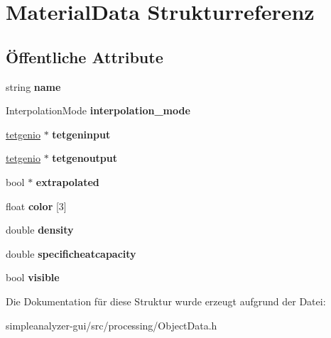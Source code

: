 \hypertarget{structMaterialData}{\section{Material\-Data Strukturreferenz}
\label{structMaterialData}
}
\subsection*{Öffentliche Attribute}
\begin{DoxyCompactItemize}
\item 
\hypertarget{structMaterialData_abed2d9d9a5fe1f943ce15bd70269821f}{string {\bfseries name}}\label{structMaterialData_abed2d9d9a5fe1f943ce15bd70269821f}

\item 
\hypertarget{structMaterialData_a17ed928b85598e5854620fa2a1abf48a}{Interpolation\-Mode {\bfseries interpolation\-\_\-mode}}\label{structMaterialData_a17ed928b85598e5854620fa2a1abf48a}

\item 
\hypertarget{structMaterialData_a1fac74787550c36c067767c59980e906}{\hyperlink{classtetgenio}{tetgenio} $\ast$ {\bfseries tetgeninput}}\label{structMaterialData_a1fac74787550c36c067767c59980e906}

\item 
\hypertarget{structMaterialData_a4ba6f20dc660f07086c5138c25c8896c}{\hyperlink{classtetgenio}{tetgenio} $\ast$ {\bfseries tetgenoutput}}\label{structMaterialData_a4ba6f20dc660f07086c5138c25c8896c}

\item 
\hypertarget{structMaterialData_ad9240e0397d480726a5b1d7572315404}{bool $\ast$ {\bfseries extrapolated}}\label{structMaterialData_ad9240e0397d480726a5b1d7572315404}

\item 
\hypertarget{structMaterialData_a22f2657161fd4046ffe87e0db8799aa1}{float {\bfseries color} \mbox{[}3\mbox{]}}\label{structMaterialData_a22f2657161fd4046ffe87e0db8799aa1}

\item 
\hypertarget{structMaterialData_a29e7d06d84da7d405b09fcf61e033e17}{double {\bfseries density}}\label{structMaterialData_a29e7d06d84da7d405b09fcf61e033e17}

\item 
\hypertarget{structMaterialData_aa2781718b37c874f6a406252299f13ef}{double {\bfseries specificheatcapacity}}\label{structMaterialData_aa2781718b37c874f6a406252299f13ef}

\item 
\hypertarget{structMaterialData_aee02870655070aac2f7e14e2f6cd2a71}{bool {\bfseries visible}}\label{structMaterialData_aee02870655070aac2f7e14e2f6cd2a71}

\end{DoxyCompactItemize}


Die Dokumentation für diese Struktur wurde erzeugt aufgrund der Datei\-:\begin{DoxyCompactItemize}
\item 
simpleanalyzer-\/gui/src/processing/Object\-Data.\-h\end{DoxyCompactItemize}
